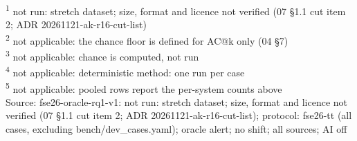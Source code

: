 \begin{table}[t]
\begin{tabular}{lllllllllllllllllllll}
\hline
\end{tabular}
\par\smallskip\footnotesize
\textsuperscript{1} not run: stretch dataset; size, format and licence not verified (07 \S{}1.1 cut item 2; ADR 20261121-ak-r16-cut-list)\\
\textsuperscript{2} not applicable: the chance floor is defined for AC@k only (04 \S{}7)\\
\textsuperscript{3} not applicable: chance is computed, not run\\
\textsuperscript{4} not applicable: deterministic method: one run per case\\
\textsuperscript{5} not applicable: pooled rows report the per-system counts above\\
Source: fse26-oracle-rq1-v1: not run: stretch dataset; size, format and licence not verified (07 \S{}1.1 cut item 2; ADR 20261121-ak-r16-cut-list); protocol: fse26-tt (all cases, excluding bench/dev\_cases.yaml); oracle alert; no shift; all sources; AI off\\
\end{table}

